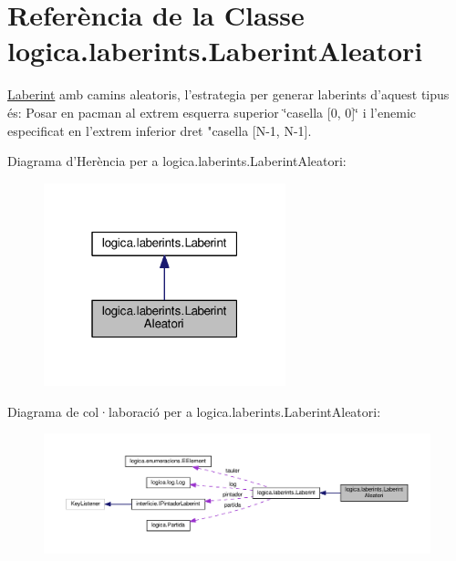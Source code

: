 \hypertarget{classlogica_1_1laberints_1_1_laberint_aleatori}{\section{Referència de la Classe logica.\+laberints.\+Laberint\+Aleatori}
\label{classlogica_1_1laberints_1_1_laberint_aleatori}
}


\hyperlink{classlogica_1_1laberints_1_1_laberint}{Laberint} amb camins aleatoris, l'estrategia per generar laberints d'aquest tipus és\+: Posar en pacman al extrem esquerra superior \char`\"{}casella \mbox{[}0, 0\mbox{]}\char`\"{} i l'enemic especificat en l'extrem inferior dret "casella \mbox{[}N-\/1, N-\/1\mbox{]}.  




Diagrama d'Herència per a logica.\+laberints.\+Laberint\+Aleatori\+:\nopagebreak
\begin{figure}[H]
\begin{center}
\leavevmode
\includegraphics[width=199pt]{classlogica_1_1laberints_1_1_laberint_aleatori__inherit__graph}
\end{center}
\end{figure}


Diagrama de col·laboració per a logica.\+laberints.\+Laberint\+Aleatori\+:\nopagebreak
\begin{figure}[H]
\begin{center}
\leavevmode
\includegraphics[width=350pt]{classlogica_1_1laberints_1_1_laberint_aleatori__coll__graph}
\end{center}
\end{figure}
